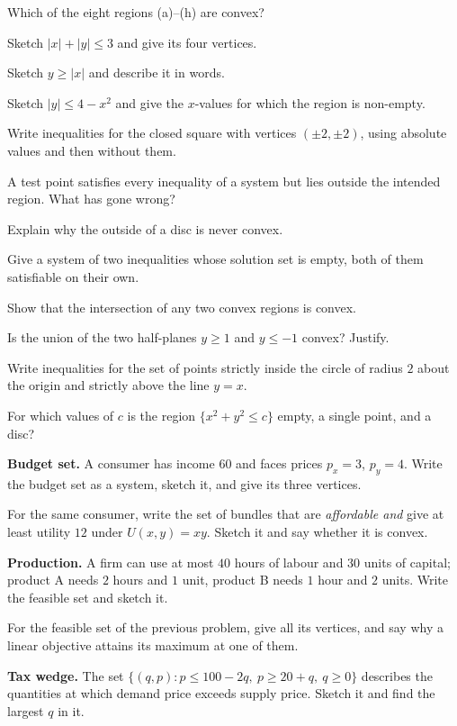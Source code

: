 \begin{problems}[resume]
  \item Which of the eight regions (a)--(h) are convex?
  \item Sketch $|x|+|y|\le 3$ and give its four vertices.
  \item Sketch $y\ge|x|$ and describe it in words.
  \item Sketch $|y|\le 4-x^{2}$ and give the $x$-values for which the
        region is non-empty.
  \item Write inequalities for the closed square with vertices
        $(\pm2,\pm2)$, using absolute values and then without them.
  \item A test point satisfies every inequality of a system but lies
        outside the intended region. What has gone wrong?
  \item Explain why the outside of a disc is never convex.
  \item Give a system of two inequalities whose solution set is empty, both
        of them satisfiable on their own.
  \item Show that the intersection of any two convex regions is convex.
  \item Is the union of the two half-planes $y\ge1$ and $y\le-1$ convex?
        Justify.
  \item Write inequalities for the set of points strictly inside the circle
        of radius $2$ about the origin and strictly above the line $y=x$.
  \item For which values of $c$ is the region $\{x^{2}+y^{2}\le c\}$ empty,
        a single point, and a disc?
\end{problems}

\begin{problems}[resume]
  \item \textbf{Budget set.} A consumer has income $60$ and faces prices
        $p_{x}=3$, $p_{y}=4$. Write the budget set as a system, sketch it,
        and give its three vertices.
  \item For the same consumer, write the set of bundles that are
        \emph{affordable and} give at least utility $12$ under
        $U(x,y)=xy$. Sketch it and say whether it is convex.
  \item \textbf{Production.} A firm can use at most $40$ hours of labour
        and $30$ units of capital; product A needs $2$ hours and $1$ unit,
        product B needs $1$ hour and $2$ units. Write the feasible set and
        sketch it.
  \item For the feasible set of the previous problem, give all its
        vertices, and say why a linear objective attains its maximum at one
        of them.
  \item \textbf{Tax wedge.} The set $\{(q,p): p\le 100-2q,\ p\ge 20+q,\
        q\ge0\}$ describes the quantities at which demand price exceeds
        supply price. Sketch it and find the largest $q$ in it.
\end{problems}

